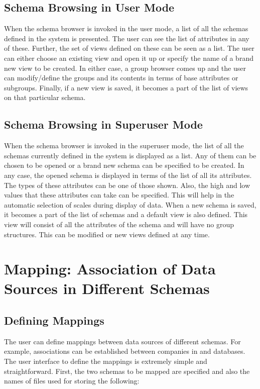 \subsection{Schema Browsing in User Mode}

When the schema browser is invoked in the user mode, a list of all the
schemas defined in the system is presented. The user can see the list
of attributes in any of these. Further, the set of views defined on
these can be seen as a list.  The user can either choose an existing
view and open it up or specify the name of a brand new view to be
created. In either case, a group browser comes up and the user can
modify/define the groups and its contents in terms of base attributes
or subgroups. Finally, if a new view is saved, it becomes a part of
the list of views on that particular schema.

\subsection{Schema Browsing in Superuser Mode}

When the schema browser is invoked in the superuser mode, the list of
all the schemas currently defined in the system is displayed as a
list. Any of them can be chosen to be opened or a brand new schema can
be specified to be created. In any case, the opened schema is
displayed in terms of the list of all its attributes. The types of
these attributes can be one of those shown. Also, the high and low
values that these attributes can take can be specified.  This will help in
the automatic selection of scales during display of data. When a new
schema is saved, it becomes a part of the list of schemas and a
default view is also defined.  This view will consist of all the
attributes of the schema and will have no group structures. This can
be modified or new views defined at any time.

\section{Mapping: Association of Data Sources in Different Schemas}

\subsection{Defining Mappings}

The user can define mappings between data sources of different
schemas.  For example, associations can be established between
companies in  and  databases. The user
interface to define the mappings is extremely simple and
straightforward. First, the two schemas to be mapped are specified and
also the names of files used for storing the following:

